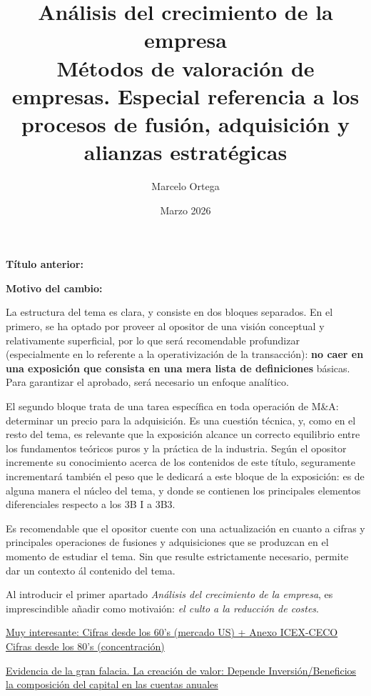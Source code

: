 \documentclass[10pt,a4paper]{article}
\title{Análisis del crecimiento de la empresa\\
\large Métodos de valoración de empresas. Especial referencia a los procesos de fusión, adquisición y alianzas estratégicas}
\author{Marcelo Ortega}
\date{Marzo 2026}
\newcommand{\puntosclave}[1]{%
  \begin{tcolorbox}[
    colframe=black,
    title={Puntos clave},
    before upper={\setlength{\parindent}{0.5cm}\setlength{\parskip}{0.5\baselineskip}}
  ]
  #1
  \end{tcolorbox}
}
\newcommand{\modificaciones}[1]{
  \begin{tcolorbox}[
    colback=white,
    colframe=red,
    title={Modificaciones a realizar},
    before upper={\setlength{\parindent}{0.5cm}\setlength{\parskip}{0.5\baselineskip}}
  ]
  #1
  \end{tcolorbox}
}
\newcommand{\changebox}{%
\begin{tcolorbox}[title={Historial de cambios del tema}]
\textbf{Título anterior:} \OldTitle\par
\textbf{Motivo del cambio:} \ChangeWhy
\end{tcolorbox}
}
\begin{document}
\maketitle
\changebox

\newpage

\puntosclave{ %
     La estructura del tema es clara, y consiste en dos bloques separados. En el primero, se ha optado por proveer al opositor de una visión conceptual y relativamente superficial, por lo que será recomendable profundizar (especialmente en lo referente a la operativización de la transacción): \textbf{no caer en una exposición que consista en una mera lista de definiciones} básicas. Para garantizar el aprobado, será necesario un enfoque analítico.

     El segundo bloque trata de una tarea específica en toda operación de M\&A: determinar un precio para la adquisición. Es una cuestión técnica, y, como en el resto del tema, es relevante que la exposición alcance un correcto equilibrio entre los fundamentos teóricos puros y la práctica de la industria. Según el opositor incremente su conocimiento acerca de los contenidos de este título, seguramente incrementará también el peso que le dedicará a este bloque de la exposición: es de alguna manera el núcleo del tema, y donde se contienen los principales elementos diferenciales respecto a los 3B I a 3B3.

     Es recomendable que el opositor cuente con una actualización en cuanto a cifras y principales operaciones de fusiones y adquisiciones que se produzcan en el momento de estudiar el tema. Sin que resulte estrictamente necesario, permite dar un contexto ál contenido del tema.
    }

\vspace{1cm}

\modificaciones{
    Al introducir el primer apartado \textit{Análisis del crecimiento de la empresa}, es imprescindible añadir como motivaión: \textit{el culto a la reducción de costes}.

    \href{https://www.nber.org/system/files/chapters/c2059/c2059.pdf}{Muy interesante: Cifras desde los 60's (mercado US) + Anexo ICEX-CECO Cifras desde los 80's (concentración)}

    \href{https://postkeynesian.net/media/working-papers/PKWP2505.pdf}{Evidencia de la gran falacia. La creación de valor: Depende Inversión/Beneficios la composición del capital en las cuentas anuales} 
}
\end{document}
